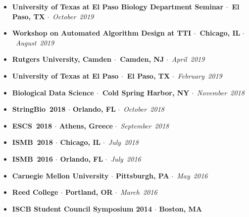 \documentclass[10pt,letterpaper]{article}
\newcommand{\bigdot}{$\cdot$\xspace}
\begin{document}
\begin{itemize}[leftmargin=*,labelindent=5pt,itemindent=-15pt]
  \item \textbf{University of Texas at El Paso Biology Department Seminar \bigdot~El Paso, TX} \bigdot~\textit{October~2019} %
  \item \textbf{Workshop on Automated Algorithm Design at TTI \bigdot~Chicago, IL} \bigdot~\textit{August~2019}%
  \item \textbf{Rutgers University, Camden \bigdot~Camden, NJ} \bigdot~\textit{April~2019} %
  \item \textbf{University of Texas at El Paso \bigdot~El Paso, TX} \bigdot~\textit{February~2019}%
  \item \textbf{Biological Data Science \bigdot~Cold Spring Harbor, NY} \bigdot~\textit{November~2018} %
   \item \textbf{StringBio~2018 \bigdot Orlando, FL} \bigdot~\textit{October~2018}%
   \item \textbf{ESCS~2018 \bigdot Athens, Greece} \bigdot~\textit{September~2018} %
    \item \textbf{ISMB~2018 \bigdot Chicago, IL} \bigdot~\textit{July~2018}%
    \item \textbf{ISMB~2016 \bigdot Orlando, FL} \bigdot~\textit{July~2016}%
    \item \textbf{Carnegie Mellon University \bigdot Pittsburgh, PA} \bigdot~\textit{May~2016}%
    \item \textbf{Reed College \bigdot Portland, OR} \bigdot~\textit{March~2016}%
    \item \textbf{ISCB Student Council Symposium 2014 \bigdot  Boston, MA}%
   
\end{itemize}
\end{document}
